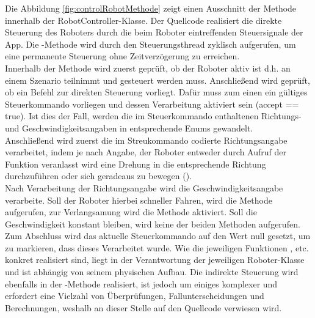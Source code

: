 \newline
Die Abbildung \eqref{fig:controlRobotMethode} zeigt einen Ausschnitt der Methode  innerhalb der RobotController-Klasse. Der Quellcode realisiert die direkte Steuerung des Roboters durch die beim Roboter eintreffenden Steuersignale der App. Die 
-Methode wird durch den Steuerungsthread zyklisch aufgerufen, um eine permanente Steuerung ohne Zeitverzögerung
zu erreichen. \\
Innerhalb der Methode wird zuerst geprüft, ob der Roboter aktiv ist d.h. an einem Szenario teilnimmt und gesteuert werden
muss. Anschließend wird geprüft, ob ein Befehl zur direkten Steuerung vorliegt. Dafür muss zum einen ein
gültiges Steuerkommando vorliegen und dessen Verarbeitung aktiviert sein (accept == true). Ist dies der Fall, werden die im Steuerkommando enthaltenen Richtungs- und Geschwindigkeitsangaben in entsprechende Enums gewandelt. \\
Anschließend wird zuerst die im Streukommando codierte Richtungsangabe verarbeitet, indem je nach Angabe, der Roboter entweder durch Aufruf der Funktion  veranlasst wird eine Drehung in die entsprechende Richtung durchzuführen oder sich geradeaus zu bewegen ().
\\
Nach Verarbeitung der Richtungsangabe wird die Geschwindigkeitsangabe verarbeite. Soll der Roboter hierbei schneller Fahren, wird die Methode  aufgerufen, zur Verlangsamung wird die Methode  aktiviert. Soll die Geschwindigkeit konstant bleiben, wird keine der beiden Methoden aufgerufen.
Zum Abschluss wird das aktuelle Steuerkommando auf den Wert null gesetzt, um zu markieren, dass dieses Verarbeitet wurde.
\medskip
\newline
Wie die jeweiligen Funktionen ,  etc. konkret realisiert sind, liegt in der Verantwortung der jeweiligen Roboter-Klasse und ist abhängig von seinem physischen Aufbau.
\medskip
\newline
Die indirekte Steuerung wird ebenfalls in der -Methode realisiert, ist jedoch um einiges komplexer und erfordert eine
Vielzahl von Überprüfungen, Fallunterscheidungen und Berechnungen, weshalb an dieser Stelle auf den Quellcode verwiesen wird.
